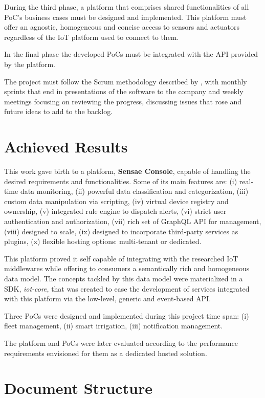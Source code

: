 During the third phase, a platform that comprises shared functionalities of all \gls{PoC}'s business cases must be designed and implemented. This platform must offer an agnostic, homogeneous and concise access to sensors and actuators regardless of the \gls{IoT} platform used to connect to them.

In the final phase the developed \gls{PoC}s must be integrated with the \gls{API} provided by the platform.

The project must follow the Scrum methodology described by \cite{schwaber1997scrum}, with monthly sprints that end in presentations of the software to the company and weekly meetings focusing on reviewing the progress, discussing issues that rose and future ideas to add to the backlog.

\section{Achieved Results}
\label{sec:introduction:achieved_results}

This work gave birth to a platform, \textbf{Sensae Console}, capable of handling the desired requirements and functionalities. Some of its main features are: (i) real-time data monitoring, (ii) powerful data classification and categorization, (iii) custom data manipulation via scripting, (iv) virtual device registry and ownership, (v) integrated rule engine to dispatch alerts, (vi) strict user authentication and authorization, (vii) rich set of GraphQL \gls{API} for management, (viii) designed to scale, (ix) designed to incorporate third-party services as plugins, (x) flexible hosting options: multi-tenant or dedicated.

This platform proved it self capable of integrating with the researched \gls{IoT} middlewares while offering to consumers a semantically rich and homogeneous data model. The concepts tackled by this data model were materialized in a \gls{SDK}, \textit{iot-core}, that was created to ease the development of services integrated with this platform via the low-level, generic and event-based \gls{API}.

Three \gls{PoC}s were designed and implemented during this project time span: (i) fleet management, (ii) smart irrigation, (iii) notification management.

The platform and \gls{PoC}s were later evaluated according to the performance requirements envisioned for them as a dedicated hosted solution.

\section{Document Structure}
\label{sec:introduction:document_structure}


